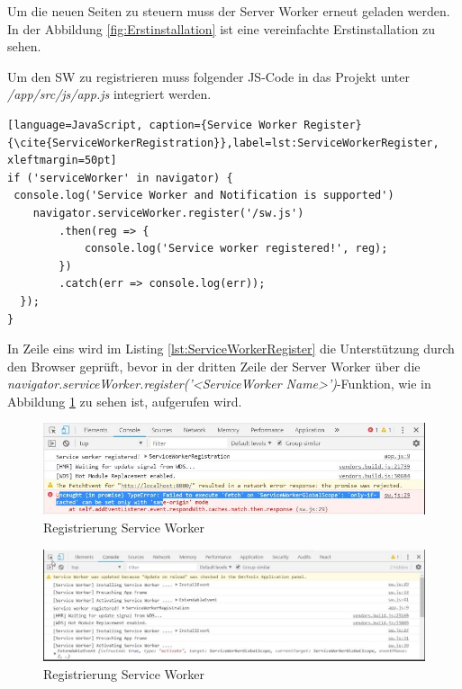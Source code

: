 Um die neuen Seiten zu steuern muss der Server Worker erneut geladen werden.
In der Abbildung \ref{fig:Erstinstallation} ist eine vereinfachte Erstinstallation zu sehen.


Um den \acs{SW} zu registrieren muss folgender \acs{JS}-Code in das Projekt unter \\ \textit{/app/src/js/app.js} integriert werden.
\begin{lstlisting}[language=JavaScript, caption={Service Worker Register} {\cite{ServiceWorkerRegistration}},label=lst:ServiceWorkerRegister, xleftmargin=50pt]
if ('serviceWorker' in navigator) {
 console.log('Service Worker and Notification is supported')
    navigator.serviceWorker.register('/sw.js')
        .then(reg => {
            console.log('Service worker registered!', reg);
        })
        .catch(err => console.log(err));
  });
}
\end{lstlisting}

In Zeile eins wird im Listing \ref{lst:ServiceWorkerRegister} die Unterstützung durch den Browser geprüft, bevor in der dritten Zeile der Server Worker über die\\ \textit{navigator.serviceWorker.register('<ServiceWorker Name>')}-Funktion, wie in Abbildung \ref{fig:RegistrierungSW} zu sehen ist, aufgerufen wird.
\begin{figure}[h]
	\centering
	\includegraphics[width=15cm]{BilderAllgemein/SW_Registred}\medskip
	\caption{Registrierung Service Worker}
	\label{fig:RegistrierungSW}
\end{figure}

\begin{figure}[h]
	\centering
	\includegraphics[width=15cm]{BilderAllgemein/SW_Activated}\medskip
	\caption{Registrierung Service Worker}
	\label{fig:Aktivierung}
\end{figure}



